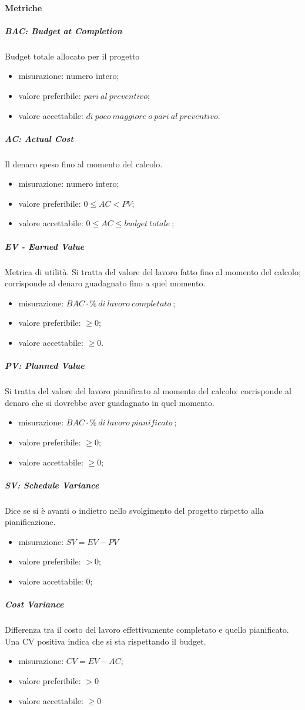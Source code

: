 		\paragraph{Metriche}
		\subparagraph{BAC: Budget at Completion}
		Budget totale allocato per il progetto
		\begin{itemize}
			\item misurazione: numero intero;
			\item valore preferibile: $pari\ al\ preventivo$;
			\item valore accettabile: $di\ poco\ maggiore\ o\ pari\ al\ preventivo$.
		\end{itemize}
			\subparagraph{AC: Actual Cost}
			Il denaro speso fino al momento del calcolo.
			\begin{itemize}
				\item  misurazione: numero intero;
				\item  valore preferibile: $0 \leq AC < PV$;
				\item  valore accettabile: $0 \leq AC \leq budget\ totale\ $;
			\end{itemize}
			\subparagraph{EV - Earned Value}
			Metrica di utilità. Si tratta del valore del lavoro fatto fino al momento del calcolo; corrisponde al denaro guadagnato fino a quel momento.
			\begin{itemize}
				\item  misurazione: $BAC \cdot \%\ di\ lavoro\ completato\ $;
				\item  valore preferibile: $ \geq 0$;
				\item  valore accettabile: $ \geq 0$.
			\end{itemize}
			\subparagraph{PV: Planned Value}
			Si tratta del valore del lavoro pianificato al momento del calcolo: corrisponde al denaro che si dovrebbe aver guadagnato in quel momento.
			\begin{itemize}
				\item  misurazione: $BAC \cdot \%\ di\ lavoro\ pianificato\ $;
				\item  valore preferibile: $ \geq 0$;
				\item  valore accettabile: $ \geq 0$;
			\end{itemize}			
			\subparagraph{SV: Schedule Variance}
			Dice se si è avanti o indietro nello svolgimento del progetto rispetto alla pianificazione.
			\begin{itemize}
				\item misurazione: $SV = EV - PV$
				\item valore preferibile: $ > 0$;
				\item valore accettabile: 0;
			\end{itemize}
			\subparagraph{Cost Variance}
			Differenza tra il costo del lavoro effettivamente completato e quello pianificato. Una CV positiva indica che si sta rispettando il budget.
			\begin{itemize}
				\item misurazione: $CV = EV - AC$;
				\item valore preferibile: $ > 0$
				\item valore accettabile: $ \geq 0$
			\end{itemize}

